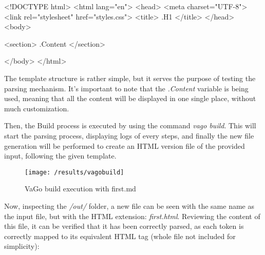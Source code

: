 \begin{code}

<!DOCTYPE html>
<html lang="en">
<head>
<meta charset="UTF-8">
<link rel="stylesheet" href="styles.css">
<title> {{ .H1 }} </title>
</head>
<body>

<section> {{ .Content }} </section>

</body>
</html>
\end{code}

The template structure is rather simple, but it serves the purpose of testing the parsing mechanism.
It's important to note that the \emph{.Content} variable is being used, meaning that all the content will be displayed
in one single place, without much customization.


Then, the Build process is executed by using the command \emph{vago build}.
This will start the parsing process, displaying logs of every steps, and finally the new file generation will be
performed to create an HTML version file of the provided input, following the given template.

\begin{figure}
    \centering
    \texttt{[image: /results/vagobuild]}
    \caption{VaGo build execution with first.md}
    \label{fig:figure}
\end{figure}

Now, inspecting the \emph{/out/} folder, a new file can be seen with the same name as the input file, but with the
HTML extension: \emph{first.html}.
Reviewing the content of this file, it can be verified that it has been correctly parsed, as each token is correctly
mapped to its equivalent HTML tag (whole file not included for simplicity):

